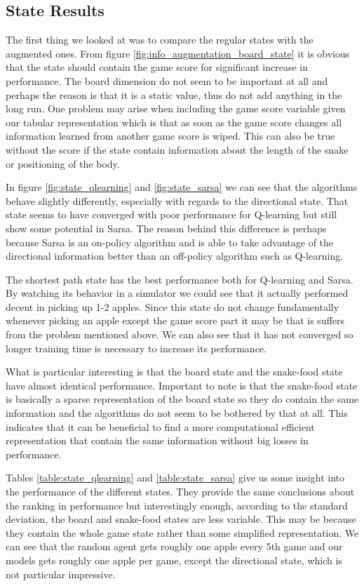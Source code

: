 \documentclass[result.tex]{subfiles}
\begin{document}
    \subsection*{State Results}

    The first thing we looked at was to compare the regular states with the augmented ones. From figure \ref{fig:info_augmentation_board_state} it is obvious that the state should contain the game score for significant increase in performance. The board dimension do not seem to be important at all and perhaps the reason is that it is a static value, thus do not add anything in the long run. One problem may arise when including the game score variable given our tabular representation which is that as soon as the game score changes all information learned from another game score is wiped. This can also be true without the score if the state contain information about the length of the snake or positioning of the body.

    In figure \ref{fig:state_qlearning} and \ref{fig:state_sarsa} we can see that the algorithms behave slightly differently, especially with regards to the directional state. That state seems to have converged with poor performance for Q-learning but still show some potential in Sarsa. The reason behind this difference is perhaps because Sarsa is an on-policy algorithm and is able to take advantage of the directional information better than an off-policy algorithm such as Q-learning.

    The shortest path state has the best performance both for Q-learning and Sarsa. By watching its behavior in a simulator we could see that it actually performed decent in picking up 1-2 apples. Since this state do not change fundamentally whenever picking an apple except the game score part it may be that is suffers from the problem mentioned above. We can also see that it has not converged so longer training time is necessary to increase its performance.

    What is particular interesting is that the board state and the snake-food state have almost identical performance. Important to note is that the snake-food state is basically a sparse representation of the board state so they do contain the same information and the algorithms do not seem to be bothered by that at all. This indicates that it can be beneficial to find a more computational efficient representation that contain the same information without big losses in performance.

    Tables \ref{table:state_qlearning} and \ref{table:state_sarsa} give us some insight into the performance of the different states. They provide the same conclusions about the ranking in performance but interestingly enough, according to the standard deviation, the board and snake-food states are less variable. This may be because they contain the whole game state rather than some simplified representation. We can see that the random agent gets roughly one apple every 5th game and our models gets roughly one apple per game, except the directional state, which is not particular impressive.
\end{document}
